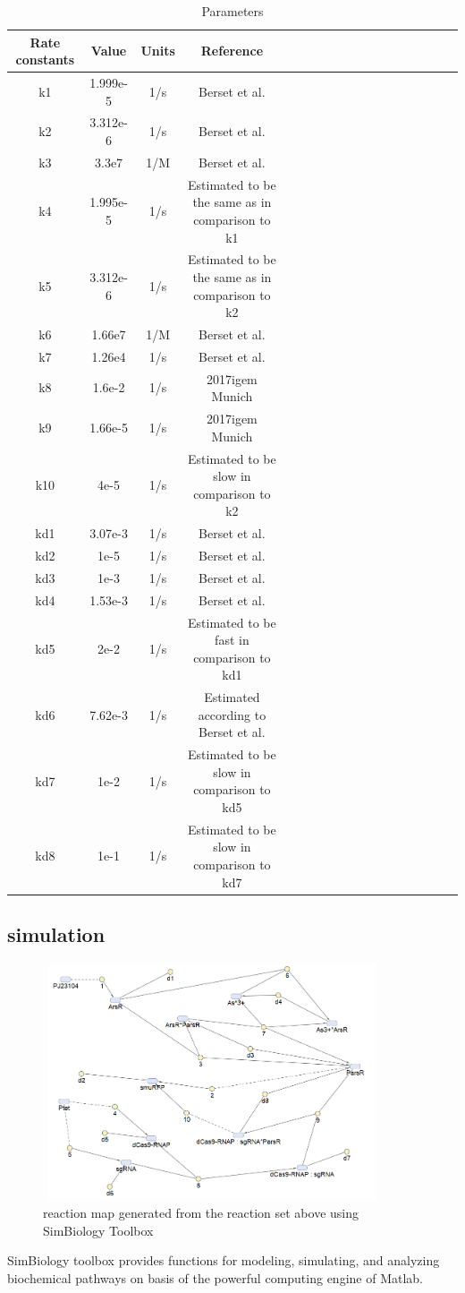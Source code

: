 \begin{table}[htbp]
	\centering
	\caption{\label {tab:test} Parameters}
	\begin{tabular}{cccccccccccccccccc}
		\toprule
		Rate constants & Value& Units & Reference\\
		\midrule
		k1 & 1.999e-5 &1/s & Berset et al. \\
	k2 & 3.312e-6 &1/s & Berset et al.\\
	k3 & 3.3e7    & 1/M &Berset et al.   \\
	k4 &1.995e-5 &1/s & Estimated to be the same as in comparison to k1\\
	k5 & 3.312e-6 &1/s&Estimated to be the same as in comparison to k2\\
	k6 &1.66e7   &1/M & Berset et al.  \\
	k7  &1.26e4 &1/s & Berset et al. \\
	k8&1.6e-2& 1/s & 2017igem Munich\\
	k9 &1.66e-5&1/s&  2017igem Munich\\ 
	k10&4e-5&1/s & Estimated to be slow in comparison to k2 \\
	kd1 & 3.07e-3&1/s & Berset et al.\\
	kd2&1e-5&1/s & Berset et al.\\
	kd3&1e-3&1/s  & Berset et al.\\
	kd4&1.53e-3&1/s  & Berset et al.\\
	kd5 & 2e-2&1/s & Estimated to be fast in comparison to kd1\\
	kd6&7.62e-3&1/s&  Estimated according to Berset et al.\\
	kd7& 1e-2&1/s&  Estimated to be slow in comparison to kd5\\
	kd8&1e-1&1/s&  Estimated to be slow in comparison to kd7\\			
		\bottomrule
	\end{tabular}
\end{table}



\subsection{simulation }
\begin{figure}[h]
	\centering
	\includegraphics[width=10cm,height=7cm]{screenshot003}	
	\caption{reaction map generated from the reaction set above using SimBiology Toolbox}
\end{figure}
SimBiology toolbox provides functions for modeling, simulating, and analyzing biochemical pathways on basis of the powerful computing engine of Matlab.

